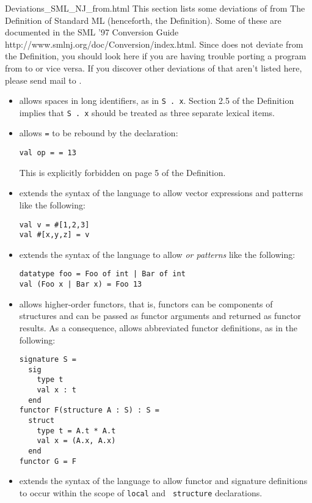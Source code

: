     {Deviations_SML_NJ_from.html}
%
This section lists some deviations of {\smlnj} from The Definition of
Standard ML (henceforth, the Definition).  Some of these are
documented in the
\htmladdnormallink
  {SML '97 Conversion Guide}
  {http://www.smlnj.org/doc/Conversion/index.html}.
Since {\mlton} does not deviate from the Definition, you should look
here if you are having trouble porting a program from {\mlton} to
{\smlnj} or vice versa.  If you discover other deviations of {\smlnj}
that aren't listed here, please send mail to {\mltonmail}.

\begin{itemize}
\item
{\smlnj} allows spaces in long identifiers, as in {\tt S . x}.
Section 2.5 of the Definition implies that {\tt S . x} should be
treated as three separate lexical items.

\item
{\smlnj} allows {\tt =} to be rebound by the declaration:
\begin{verbatim}
val op = = 13
\end{verbatim}
This is explicitly forbidden on page 5 of the Definition.

\item
{\smlnj} extends the syntax of the language to allow
vector expressions and patterns like the following:
\begin{verbatim}
val v = #[1,2,3]
val #[x,y,z] = v
\end{verbatim}
%
\item 
{\smlnj} extends the syntax of the language to allow {\em or patterns}
like the following:
\begin{verbatim}
datatype foo = Foo of int | Bar of int
val (Foo x | Bar x) = Foo 13
\end{verbatim}
%
\item
{\smlnj} allows higher-order functors, that is, functors can be
components of structures and can be passed as functor arguments and
returned as functor results.  As a consequence, {\smlnj} allows
abbreviated functor definitions, as in the following:
\begin{verbatim}
signature S =
  sig
    type t
    val x : t
  end
functor F(structure A : S) : S = 
  struct
    type t = A.t * A.t
    val x = (A.x, A.x)
  end
functor G = F
\end{verbatim} 
%
\item
{\smlnj} extends the syntax of the language to allow functor and
signature definitions to occur within the scope of {\tt local} and {\tt
structure} declarations.


\end{itemize}
